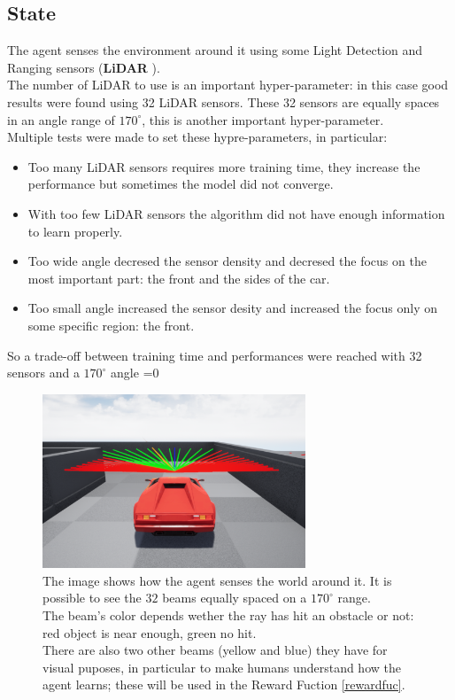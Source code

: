 \documentclass[14pt]{extarticle}
\def\sp{\vspace{5pt}}
\newcounter{debug}
\begin{document}
\begin{flushleft}
	\subsection{State}
	\sp
	The agent senses the environment around it using some Light Detection and Ranging sensors (\textbf{LiDAR} \cite{LiDAR}). \\
	The number of LiDAR to use is an important hyper-parameter: in this case good results were found using 32 LiDAR sensors. These 32 sensors are equally spaces in an angle range of $170^{\circ}$, this is another important hyper-parameter. \\
	Multiple tests were made to set these hypre-parameters, in particular:
	\begin{itemize}
	\item Too many LiDAR sensors requires more training time, they increase the performance but sometimes the model did not converge.
	\item With too few LiDAR sensors the algorithm did not have enough information to learn properly.
	\item Too wide angle decresed the sensor density and decresed the focus on the most important part: the front and the sides of the car.
	\item Too small angle increased the sensor desity and increased the focus only on some specific region: the front.
	\end{itemize}
	So a trade-off between training time and performances were reached with 32 sensors and a $170^{\circ}$ angle
	\ifnum\value{debug}=0 {
	\begin{figure}[H] \label{carState}
    		\centering\includegraphics[width=0.7\textwidth]{./Image/State/carSensors.png}
		\vspace{5mm}
		\caption{The image shows how the agent senses the world around it. It is possible to see the $32$ beams equally spaced on a $170^{\circ}$ range. \\
		The beam's color depends wether the ray has hit an obstacle or not: red object is near enough, green no hit. \\
		There are also two other beams (yellow and blue) they have for visual puposes, in particular to make humans understand how the agent learns; these will be used in the Reward Fuction \ref{rewardfuc}.}
	\end{figure}
	}\fi
	

\end{flushleft}
\end{document}
